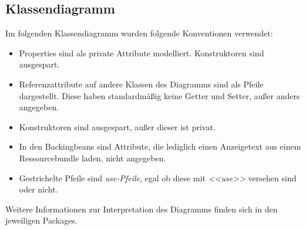
\newcommand{\classtable}[1]{\begin{longtable}[H]{m{5cm}m{9cm}}
                                \hline
                                \textbf{Klassenname} & \textbf{Beschreibung} \\
                                \hline
                                \hline
                                #1
\end{longtable}
}

\newcommand{\classentry}[2]{\textbf{#1} & #2 \\
	\hline
}

\subsection{Klassendiagramm}

Im folgenden Klassendiagramm wurden folgende Konventionen verwendet:
\begin{itemize}
    \item Properties sind als private Attribute modelliert.
    Konstruktoren sind ausgespart.
    \item Referenzattribute auf andere Klassen des Diagramms sind als Pfeile dargestellt.
    Diese haben standardmäßig keine Getter und Setter, außer anders angegeben.
    \item Konstruktoren sind ausgespart, außer dieser ist privat.
    \item In den Backingbeans sind Attribute, die lediglich einen Anzeigetext aus einem Ressourcebundle laden, nicht angegeben.
    \item Gestrichelte Pfeile sind \emph{use-Pfeile}, egal ob diese mit \emph{<<use>>} versehen sind oder nicht.
\end{itemize}

Weitere Informationen zur Interpretation des Diagramms finden sich in den jeweiligen Packages.

